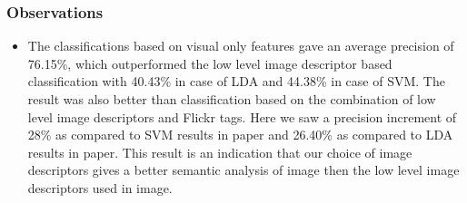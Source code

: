 \subsubsection*{Observations}
\begin{itemize}
\item The classifications based on visual only features gave an 
average precision of 76.15\%, which outperformed the low level image 
descriptor based classification with 40.43\% in case of LDA and 
44.38\% in case of SVM. The result was also better than 
classification based on the combination of low level image 
descriptors and Flickr tags. Here we saw a precision increment of 
28\% as compared to SVM results in paper and 26.40\% as compared to 
LDA results in paper. This result is an indication that our choice of image descriptors gives a better semantic analysis of image then the low level image descriptors used in image.








\end{itemize}
